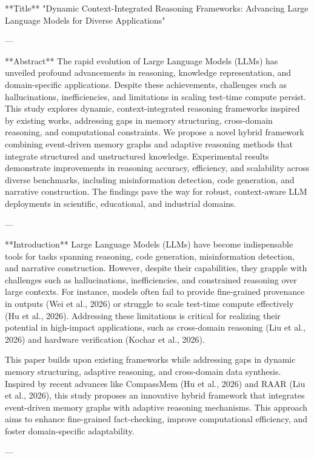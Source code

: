**Title**  
"Dynamic Context-Integrated Reasoning Frameworks: Advancing Large Language Models for Diverse Applications"

---

**Abstract**  
The rapid evolution of Large Language Models (LLMs) has unveiled profound advancements in reasoning, knowledge representation, and domain-specific applications. Despite these achievements, challenges such as hallucinations, inefficiencies, and limitations in scaling test-time compute persist. This study explores dynamic, context-integrated reasoning frameworks inspired by existing works, addressing gaps in memory structuring, cross-domain reasoning, and computational constraints. We propose a novel hybrid framework combining event-driven memory graphs and adaptive reasoning methods that integrate structured and unstructured knowledge. Experimental results demonstrate improvements in reasoning accuracy, efficiency, and scalability across diverse benchmarks, including misinformation detection, code generation, and narrative construction. The findings pave the way for robust, context-aware LLM deployments in scientific, educational, and industrial domains.

---

**Introduction**  
Large Language Models (LLMs) have become indispensable tools for tasks spanning reasoning, code generation, misinformation detection, and narrative construction. However, despite their capabilities, they grapple with challenges such as hallucinations, inefficiencies, and constrained reasoning over large contexts. For instance, models often fail to provide fine-grained provenance in outputs (Wei et al., 2026) or struggle to scale test-time compute effectively (Hu et al., 2026). Addressing these limitations is critical for realizing their potential in high-impact applications, such as cross-domain reasoning (Liu et al., 2026) and hardware verification (Kochar et al., 2026).

This paper builds upon existing frameworks while addressing gaps in dynamic memory structuring, adaptive reasoning, and cross-domain data synthesis. Inspired by recent advances like CompassMem (Hu et al., 2026) and RAAR (Liu et al., 2026), this study proposes an innovative hybrid framework that integrates event-driven memory graphs with adaptive reasoning mechanisms. This approach aims to enhance fine-grained fact-checking, improve computational efficiency, and foster domain-specific adaptability.

---

